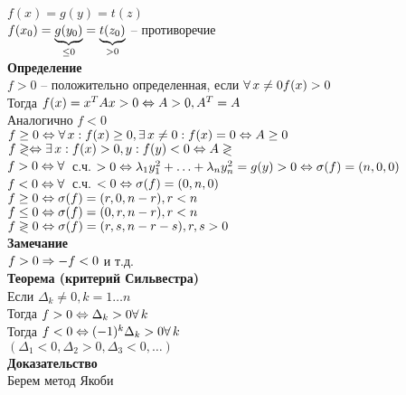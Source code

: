 \documentclass[12pt]{article}
\begin{document}
$f(x) = g(y) = t(z)$\\
$f(x_0) = \ub{\leq 0}{g(y_0)} = \ub{> 0}{t(z_0)}$ -- противоречие\\
\textbf{Определение}\\
$f > 0$ -- положительно определенная, если $\fall x \neq 0 f(x) > 0$\\
Тогда $f(x) = x^T Ax > 0 \LRto A > 0, A^T = A$\\
Аналогично $f < 0$\\
$f \geq 0 \LRto \fall x: f(x) \geq 0, \ex x \neq 0: f(x) = 0 \LRto A \geq 0$\\
$f \gtrless \LRto \ex x: f(x) > 0, y: f(y) < 0 \LRto A \gtrless$\\
$f > 0 \LRto \fall $ с.ч. $> 0 \LRto \lambda_1 y_1^2 + \ldots + \lambda_ny_n^2 = g(y) > 0 \LRto \sigma(f) = (n, 0, 0)$\\
$f < 0 \LRto \fall $ с.ч. $< 0 \LRto \sigma(f) = (0, n, 0)$\\
$f \geq 0 \LRto \sigma(f) = (r, 0, n-r), r < n$\\
$f \leq 0 \LRto \sigma(f) = (0, r, n-r), r < n$\\
$f \gtrless 0 \LRto \sigma(f) = (r, s, n-r-s), r, s > 0$\\
\textbf{Замечание}\\
$f > 0 \Rto -f < 0$ и т.д.\\
\textbf{Теорема (критерий Сильвестра)}\\
Если $\Delta_k \neq 0, k=1\ldots n$\\
Тогда $f > 0 \LRto \Delta_k > 0 \fall k$\\
Тогда $f < 0 \LRto (-1)^k\Delta_k > 0 \fall k$\\
$(\Delta_1 < 0, \Delta_2 > 0, \Delta_3 < 0, \ldots)$\\
\textbf{Доказательство}\\
Берем метод Якоби\\
\end{document}
